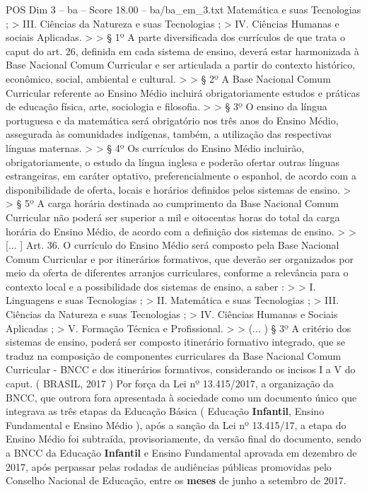 \begin{textsample}{POS Dim 3 – ba – Score 18.00 – ba/ba\_em\_3.txt}
Matemática e suas Tecnologias ; > III.
Ciências da Natureza e suas Tecnologias ; > IV.
Ciências Humanas e sociais Aplicadas. > > § 1º A parte diversificada dos currículos de que trata o caput do art. 26, definida em cada sistema de ensino, deverá estar harmonizada à Base Nacional Comum Curricular e ser articulada a partir do contexto histórico, econômico, social, ambiental e cultural. > > § 2º A Base Nacional Comum Curricular referente ao Ensino Médio incluirá obrigatoriamente estudos e práticas de educação física, arte, sociologia e filosofia. > > § 3º O ensino da língua portuguesa e da matemática será obrigatório nos três anos do Ensino Médio, assegurada às comunidades indígenas, também, a utilização das respectivas línguas maternas. > > § 4º Os currículos do Ensino Médio incluirão, obrigatoriamente, o estudo da língua inglesa e poderão ofertar outras línguas estrangeiras, em caráter optativo, preferencialmente o espanhol, de acordo com a disponibilidade de oferta, locais e horários definidos pelos sistemas de ensino. > > § 5º A carga horária destinada ao cumprimento da Base Nacional Comum Curricular não poderá ser superior a mil e oitocentas horas do total da carga horária do Ensino Médio, de acordo com a definição dos sistemas de ensino. > > [... ] Art. 36.
O currículo do Ensino Médio será composto pela Base Nacional Comum Curricular e por itinerários formativos, que deverão ser organizados por meio da oferta de diferentes arranjos curriculares, conforme a relevância para o contexto local e a possibilidade dos sistemas de ensino, a saber : > > I.
Linguagens e suas Tecnologias ; > II.
Matemática e suas Tecnologias ; > III.
Ciências da Natureza e suas Tecnologias ; > IV.
Ciências Humanas e Sociais Aplicadas ; > V.
Formação Técnica e Profissional. > > (... ) § 3º A critério dos sistemas de ensino, poderá ser composto itinerário formativo integrado, que se traduz na composição de componentes curriculares da Base Nacional Comum Curricular - BNCC e dos itinerários formativos, considerando os incisos I a V do caput. ( BRASIL, 2017 ) Por força da Lei nº 13.415/2017, a organização da BNCC, que outrora fora apresentada à sociedade como um documento único que integrava as três etapas da Educação Básica ( Educação \textbf{Infantil}, Ensino Fundamental e Ensino Médio ), após a sanção da Lei nº 13.415/17, a etapa do Ensino Médio foi subtraída, provisoriamente, da versão final do documento, sendo a BNCC da Educação \textbf{Infantil} e Ensino Fundamental aprovada em dezembro de 2017, após perpassar pelas rodadas de audiências públicas promovidas pelo Conselho Nacional de Educação, entre os \textbf{meses} de junho a setembro de 2017.

\end{textsample}
